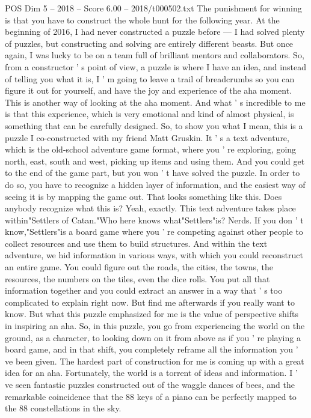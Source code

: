 \begin{textsample}{POS Dim 5 – 2018 – Score 6.00 – 2018/t000502.txt}
The punishment for winning is that you have to construct the whole hunt for the following year.
At the beginning of 2016, I had never constructed a puzzle before — I had solved plenty of puzzles, but constructing and solving are entirely different beasts.
But once again, I was lucky to be on a team full of brilliant mentors and collaborators.
So, from a constructor ' s point of view, a puzzle is where I have an idea, and instead of telling you what it is, I ' m going to leave a trail of breadcrumbs so you can figure it out for yourself, and have the joy and experience of the aha moment.
This is another way of looking at the aha moment.
And what ' s incredible to me is that this experience, which is very emotional and kind of almost physical, is something that can be carefully designed.
So, to show you what I mean, this is a puzzle I co-constructed with my friend Matt Gruskin.
It ' s a text adventure, which is the old-school adventure game format, where you ' re exploring, going north, east, south and west, picking up items and using them.
And you could get to the end of the game part, but you won ' t have solved the puzzle.
In order to do so, you have to recognize a hidden layer of information, and the easiest way of seeing it is by mapping the game out.
That looks something like this.
Does anybody recognize what this is?
Yeah, exactly.
This text adventure takes place within"Settlers of Catan."Who here knows what"Settlers"is?
Nerds.
If you don ' t know,"Settlers"is a board game where you ' re competing against other people to collect resources and use them to build structures.
And within the text adventure, we hid information in various ways, with which you could reconstruct an entire game.
You could figure out the roads, the cities, the towns, the resources, the numbers on the tiles, even the dice rolls.
You put all that information together and you could extract an answer in a way that ' s too complicated to explain right now.
But find me afterwards if you really want to know.
But what this puzzle emphasized for me is the value of perspective shifts in inspiring an aha.
So, in this puzzle, you go from experiencing the world on the ground, as a character, to looking down on it from above as if you ' re playing a board game, and in that shift, you completely reframe all the information you ' ve been given.
The hardest part of construction for me is coming up with a great idea for an aha.
Fortunately, the world is a torrent of ideas and information.
I ' ve seen fantastic puzzles constructed out of the waggle dances of bees, and the remarkable coincidence that the 88 keys of a piano can be perfectly mapped to the 88 constellations in the sky.

\end{textsample}
